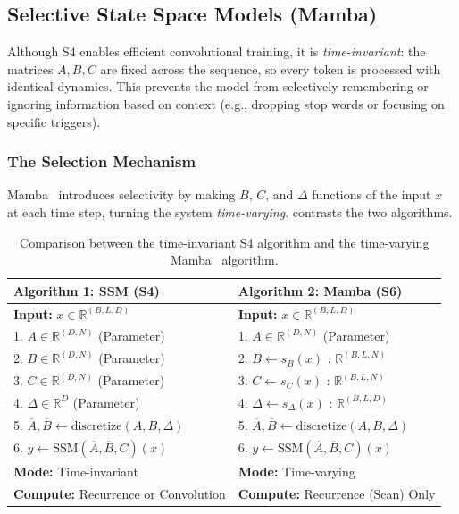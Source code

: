 \subsection{Selective State Space Models (Mamba)}
\label{sec:mamba}

Although S4 enables efficient convolutional training, it is \textit{time-invariant}: the matrices $A, B, C$ are fixed across the sequence, so every token is processed with identical dynamics. This prevents the model from selectively remembering or ignoring information based on context (e.g., dropping stop words or focusing on specific triggers).

\subsubsection{The Selection Mechanism}
Mamba~\cite{mamba} introduces selectivity by making $B$, $C$, and $\Delta$ functions of the input $x$ at each time step, turning the system \textit{time-varying}.  contrasts the two algorithms.

\begin{table}[htbp]
    \centering
    \caption{Comparison between the time-invariant S4 algorithm and the time-varying Mamba~\cite{mamba} algorithm.}
    \begin{tabular}{|l|l|}
    \hline
    \textbf{Algorithm 1: SSM (S4)} & \textbf{Algorithm 2: Mamba (S6)} \\ \hline
    \textbf{Input:} $x \in \mathbb{R}^{(B, L, D)}$ & \textbf{Input:} $x \in \mathbb{R}^{(B, L, D)}$ \\ \hline
    1. $A \in \mathbb{R}^{(D, N)}$ (Parameter) & 1. $A \in \mathbb{R}^{(D, N)}$ (Parameter) \\
    2. $B \in \mathbb{R}^{(D, N)}$ (Parameter) & 2. $B \leftarrow s_B(x)$ : $\mathbb{R}^{(B, L, N)}$ \\
    3. $C \in \mathbb{R}^{(D, N)}$ (Parameter) & 3. $C \leftarrow s_C(x)$ : $\mathbb{R}^{(B, L, N)}$ \\
    4. $\Delta \in \mathbb{R}^{D}$ (Parameter) & 4. $\Delta \leftarrow s_\Delta(x)$ : $\mathbb{R}^{(B, L, D)}$ \\
    5. $\overline{A}, \overline{B} \leftarrow \text{discretize}(A, B, \Delta)$ & 5. $\overline{A}, \overline{B} \leftarrow \text{discretize}(A, B, \Delta)$ \\
    6. $y \leftarrow \text{SSM}(\overline{A}, \overline{B}, C)(x)$ & 6. $y \leftarrow \text{SSM}(\overline{A}, \overline{B}, C)(x)$ \\ \hline
    \textbf{Mode:} Time-invariant & \textbf{Mode:} Time-varying \\
    \textbf{Compute:} Recurrence or Convolution & \textbf{Compute:} Recurrence (Scan) Only \\ \hline
    \end{tabular}
    \label{tab:s4_vs_s6}
\end{table}

